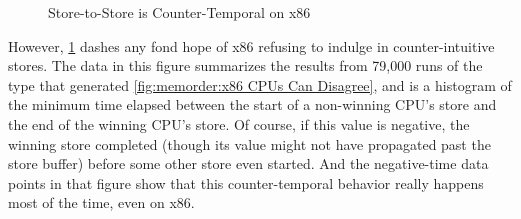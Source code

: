 {\begin{figure}
\centering
{}
\caption{Store-to-Store is Counter-Temporal on x86}
\label{fig:memorder:Store-to-Store is Counter-Temporal on x86}
\end{figure}

	However,
	\cref{fig:memorder:Store-to-Store is Counter-Temporal on x86}
	dashes any fond hope of x86 refusing to indulge in
	counter-intuitive stores.
	The data in this figure summarizes the results from 79,000 runs
	of the type that generated
	\cref{fig:memorder:x86 CPUs Can Disagree},
	and is a histogram of the minimum time elapsed between the start of
	a non-winning CPU's store and the end of the winning CPU's store.
	Of course, if this value is negative, the winning store completed
	(though its value might not have propagated past the store buffer)
	before some other store even started.
	And the negative-time data points in that figure show that
	this counter-temporal behavior really happens most of the time,
	even on x86.

}
